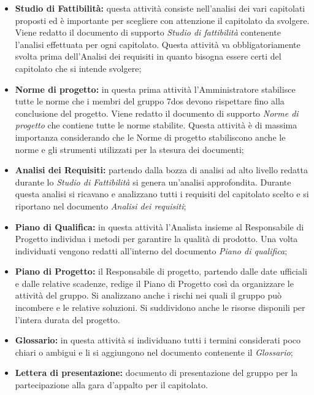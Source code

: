 \begin{itemize}

	\item \textbf{Studio di Fattibilità:} questa attività consiste nell'analisi dei vari capitolati proposti ed è importante per scegliere con attenzione il capitolato da svolgere. Viene redatto il documento di supporto \textit{Studio di fattibilità} contenente l'analisi effettuata per ogni capitolato. Questa attività va obbligatoriamente svolta prima dell'Analisi dei requisiti in quanto bisogna essere certi del capitolato che si intende svolgere;

	\item \textbf{Norme di progetto:} in questa prima attività l'Amministratore stabilisce tutte le norme che i membri del gruppo 7dos devono rispettare fino alla conclusione del progetto. Viene redatto il documento di supporto \textit{Norme di progetto} che contiene tutte le norme stabilite. Questa attività è di massima importanza considerando che le Norme di progetto stabiliscono anche le norme e gli strumenti utilizzati per la stesura dei documenti;

	\item \textbf{Analisi dei Requisiti:} partendo dalla bozza di analisi ad alto livello redatta durante lo \textit{Studio di Fattibilità} si genera un'analisi approfondita. Durante questa analisi si ricavano e analizzano tutti i requisiti del capitolato scelto e si riportano nel documento \textit{Analisi dei requisiti};

	\item \textbf{Piano di Qualifica:} in questa attività l'Analista insieme al Responsabile di Progetto individua i metodi per garantire la qualità di prodotto. Una volta individuati vengono redatti all'interno del documento \textit{Piano di qualifica};

	\item \textbf{Piano di Progetto:} il Responsabile di progetto, partendo dalle date ufficiali e dalle relative scadenze, redige il Piano di Progetto così da organizzare le attività del gruppo. Si analizzano anche i rischi nei quali il gruppo può incombere e le relative soluzioni. Si suddividono anche le risorse disponili per l'intera durata del progetto.

	\item \textbf{Glossario:} in questa attività si individuano tutti i termini considerati poco chiari o ambigui e li si aggiungono nel documento contenente il \textit{Glossario};
	
	\item \textbf{Lettera di presentazione:} documento di presentazione del gruppo per la partecipazione alla gara d'appalto per il capitolato.

\end{itemize}


